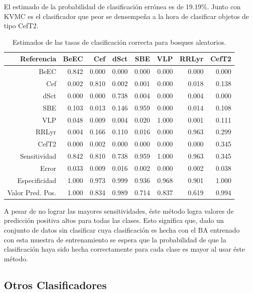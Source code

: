 \documentclass[letterpaper,12pt]{book}
\begin{document}
El estimado de la probabilidad de clasificación errónea es de 19.19\%. Junto con KVMC es el clasificador que peor se densempeña a la hora de clasificar objetos de tipo CefT2. 

\begin{table}[ht]
  \centering
  \begin{tabular}{rrrrrrrr}
    Referencia & BeEC & Cef & dSct & SBE & VLP & RRLyr & CefT2 \\ 
    \hline
    BeEC & 0.842 & 0.000 & 0.000 & 0.000 & 0.000 & 0.000 & 0.000 \\ 
    Cef & 0.002 & 0.810 & 0.002 & 0.001 & 0.000 & 0.018 & 0.138 \\ 
    dSct & 0.000 & 0.000 & 0.738 & 0.004 & 0.000 & 0.004 & 0.000 \\ 
    SBE & 0.103 & 0.013 & 0.146 & 0.959 & 0.000 & 0.014 & 0.108 \\ 
    VLP & 0.048 & 0.009 & 0.004 & 0.020 & 1.000 & 0.001 & 0.111 \\ 
    RRLyr & 0.004 & 0.166 & 0.110 & 0.016 & 0.000 & 0.963 & 0.299 \\ 
    CefT2 & 0.000 & 0.002 & 0.000 & 0.000 & 0.000 & 0.000 & 0.345 \\
    \hline
    \hline
    Sensitividad &  0.842 & 0.810 & 0.738 & 0.959 & 1.000 & 0.963 & 0.345 \\
    \hline
    Error & 0.033 & 0.009 & 0.016 & 0.002 & 0.000 & 0.002 & 0.038 \\ 
    \hline
    \hline
    Especificidad &  1.000 & 0.973 & 0.999 & 0.936 & 0.968 & 0.901 & 1.000 \\ 
    \hline
    \hline
Valor Pred. Pos. & 1.000 & 0.834 & 0.989 & 0.714 & 0.837 & 0.619 & 0.994 \\ 
    \hline
    \hline
  \end{tabular}
  \caption{Estimados de las tasas de clasificación correcta para bosques aleatorios.}
\end{table}

A pesar de no lograr las mayores sensitividades, éste método logra valores de predicción positiva altos para todas las clases. Esto significa que, dado un conjunto de datos sin clasificar cuya clasificación es hecha con el BA entrenado con esta muestra de entrenamiento se espera que la probabilidad  de que la clasificación haya sido hecha correctamente para cada clase es mayor al usar éste método. 

\subsection{Otros Clasificadores}
\end{document}
